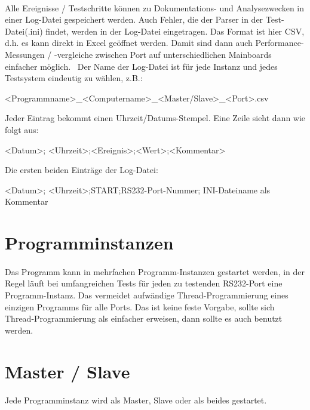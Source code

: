 \paragraph{}
Alle Ereignisse / Testschritte können zu Dokumentations- und Analysezwecken in einer Log-Datei gespeichert werden. Auch Fehler, die der Parser in der Test-Datei(.ini) findet, werden in der Log-Datei eingetragen. Das Format ist hier CSV, d.h. es kann direkt in Excel geöffnet werden. Damit sind dann auch Performance-Messungen / -vergleiche zwischen Port auf unterschiedlichen Mainboards einfacher möglich.
\
Der Name der Log-Datei ist für jede Instanz und jedes Testsystem eindeutig zu wählen, z.B.:
\begin{center}
<Programmname>\_<Computername>\_<Master/Slave>\_<Port>.csv
\end{center}
Jeder Eintrag bekommt einen Uhrzeit/Datums-Stempel. Eine Zeile sieht dann wie folgt aus:
\begin{center}
<Datum>; <Uhrzeit>;<Ereignis>;<Wert>;<Kommentar>
\end{center}
Die ersten beiden  Einträge der Log-Datei:
\begin{center}
<Datum>; <Uhrzeit>;START;RS232-Port-Nummer; INI-Dateiname als Kommentar
\end{center}


\section{Programminstanzen}
\paragraph{}
Das Programm kann in mehrfachen Programm-Instanzen gestartet werden, in der Regel läuft bei umfangreichen Tests für jeden zu testenden RS232-Port eine Programm-Instanz. Das vermeidet aufwändige Thread-Programmierung eines einzigen Programms für alle Ports. Das ist keine feste Vorgabe, sollte sich Thread-Programmierung als einfacher erweisen, dann sollte es auch benutzt werden.


\section{Master / Slave}
\paragraph{}
Jede Programminstanz wird als Master, Slave oder als beides gestartet.


